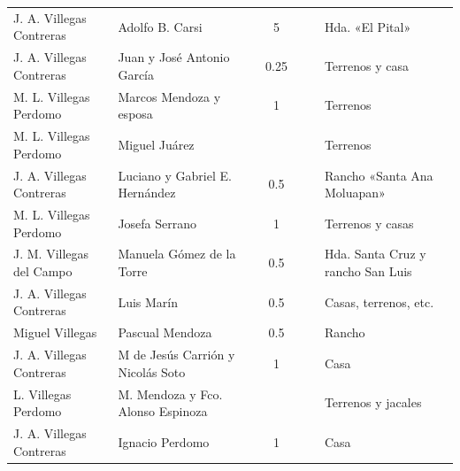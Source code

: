 \documentclass[14pt,twoside,final]{extbook} %
\begin{document}
{\begin{longtable}[c]{@{}p{2.5cm}lrSrrl@{}}
J. A. Villegas Contreras & Adolfo B. Carsi &  & 5 &  &  & Hda. «El Pital» \\
J. A. Villegas Contreras & Juan y José Antonio García &  & 0.25 &  &  & Terrenos y casa \\
M. L. Villegas Perdomo & Marcos Mendoza y esposa &  & 1 & {} & {} & Terrenos \\
M. L. Villegas Perdomo & Miguel Juárez &  & {} & {} & {} & Terrenos \\
J. A. Villegas Contreras & Luciano y Gabriel E. Hernández &  & 0.5 &  &  & Rancho «Santa Ana Moluapan» \\
M. L. Villegas Perdomo & Josefa Serrano &  & 1 & {} & {} & Terrenos y casas \\
J. M. Villegas del Campo & Manuela Gómez de la Torre &  & 0.5 &  &  & Hda. Santa Cruz y rancho San Luis \\
J. A. Villegas Contreras & Luis Marín &  & 0.5 &  &  & Casas, terrenos, etc. \\
Miguel Villegas & Pascual Mendoza &  & 0.5 & {} & {} & Rancho \\
J. A. Villegas Contreras & M de Jesús Carrión y Nicolás Soto &  & 1 & {} & {} & Casa \\
L. Villegas Perdomo & M. Mendoza y Fco. Alonso Espinoza &  & {} & {} & {} & Terrenos y jacales \\
J. A. Villegas Contreras & Ignacio Perdomo &  & 1 &  &  & Casa \\

\end{longtable}}
\end{document}

